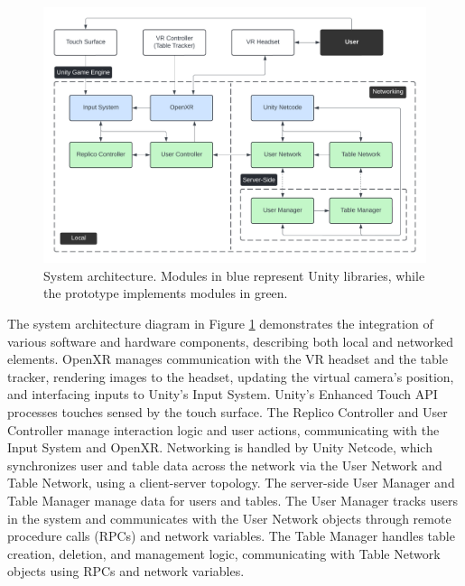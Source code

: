     \begin{figure}[h]
        \centering
        \includegraphics[width=.97\linewidth]{figures/architecture.png}
        \caption{System architecture. Modules in blue represent Unity libraries, while the prototype implements modules in green.}
        \label{fig:architecture}
    \end{figure}
    
    The system architecture diagram in Figure \ref{fig:architecture} demonstrates the integration of various software and hardware components, describing both local and networked elements. OpenXR manages communication with the VR headset and the table tracker, rendering images to the headset, updating the virtual camera's position, and interfacing inputs to Unity's Input System. Unity's Enhanced Touch API processes touches sensed by the touch surface. The Replico Controller and User Controller manage interaction logic and user actions, communicating with the Input System and OpenXR. Networking is handled by Unity Netcode, which synchronizes user and table data across the network via the User Network and Table Network, using a client-server topology. The server-side User Manager and Table Manager manage data for users and tables. The User Manager tracks users in the system and communicates with the User Network objects through remote procedure calls (RPCs) and network variables. The Table Manager handles table creation, deletion, and management logic, communicating with Table Network objects using RPCs and network variables.



